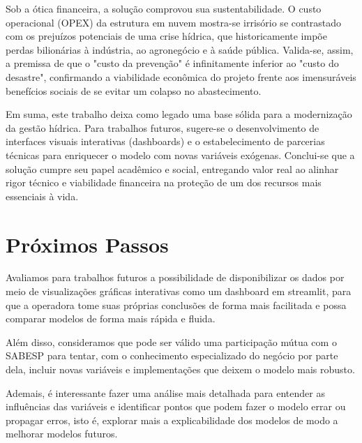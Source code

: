 Sob a ótica financeira, a solução comprovou sua sustentabilidade. O custo operacional (\acrshort{OPEX}) da estrutura em nuvem mostra-se irrisório se contrastado com os prejuízos potenciais de uma crise hídrica, que historicamente impõe perdas bilionárias à indústria, ao agronegócio e à saúde pública. Valida-se, assim, a premissa de que o "custo da prevenção" é infinitamente inferior ao "custo do desastre", confirmando a viabilidade econômica do projeto frente aos imensuráveis benefícios sociais de se evitar um colapso no abastecimento. 

Em suma, este trabalho deixa como legado uma base sólida para a modernização da gestão hídrica. Para trabalhos futuros, sugere-se o desenvolvimento de interfaces visuais interativas (dashboards) e o estabelecimento de parcerias técnicas para enriquecer o modelo com novas variáveis exógenas. Conclui-se que a solução cumpre seu papel acadêmico e social, entregando valor real ao alinhar rigor técnico e viabilidade financeira na proteção de um dos recursos mais essenciais à vida. 

\section{Próximos Passos}

Avaliamos para trabalhos futuros a possibilidade de disponibilizar os dados por meio de visualizações gráficas interativas como um dashboard em streamlit, para que a operadora tome suas próprias conclusões de forma mais facilitada e possa comparar modelos de forma mais rápida e fluida.  

Além disso, consideramos que pode ser válido uma participação mútua com o \acrshort{SABESP} para tentar, com o conhecimento especializado do negócio por parte dela, incluir novas variáveis e implementações que deixem o modelo mais robusto. 

Ademais, é interessante fazer uma análise mais detalhada para entender as influências das variáveis e identificar pontos que podem fazer o modelo errar ou propagar erros, isto é, explorar mais a explicabilidade dos modelos de modo a melhorar modelos futuros.  